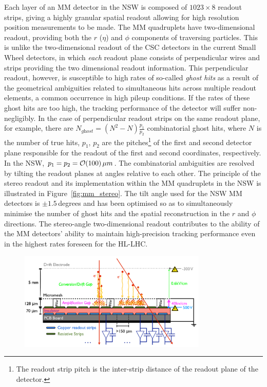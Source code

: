 Each layer of an MM detector in the NSW is composed of $1023 \times 8$ readout strips, giving
a highly granular spatial readout allowing for high resolution position measurements to be made.
The MM quadruplets have two-dimensional readout, providing  both the $r$ ($\eta$)
and $\phi$ components of traversing particles.
This is unlike the two-dimensional readout of the CSC detectors in the current Small Wheel detectors,
in which \textit{each} readout plane consists of perpendicular wires and strips providing
the two dimensional readout information.
This perpendicular readout, however, is susceptible to high rates of so-called \textit{ghost hits}
as a result of the geometrical ambiguities related to simultaneous hits across multiple readout elements, 
a common occurrence in high pileup conditions.
If the rates of these ghost hits are too high, the tracking performance of the detector will suffer non-negligibly.
In the case of perpendicular readout strips on the same readout plane, for example, there are $N_{\textit{ghost}} = (N^2 - N) \frac{p_1}{p_2}$
combinatorial ghost hits, where $N$ is the number of true hits, $p_1$, $p_2$ are the pitches\footnote{The readout strip pitch
is the inter-strip distance of the readout plane of the detector.} of the first and
second detector plane responsible for the readout of the first and second coordinates, respectively.
In the NSW, $p_1 = p_2 = \mathcal{O}(100)\,\mu m$.
The combinatorial ambiguities are resolved by tilting the readout planes at angles relative to
each other.
The principle of the stereo readout and its implementation within the MM quadruplets in the NSW
is illustrated in Figure~\ref{fig:mm_stereo}.
The tilt angle used for the NSW MM detectors is $\pm 1.5$\,degrees and has been optimised so as to simultaneously minimise
the number of ghost hits and the spatial reconstruction in the $r$ and $\phi$ directions.
The stereo-angle two-dimensional readout contributes to the ability of the MM detectors' ability
to maintain high-precision tracking performance even in the highest rates foreseen for the HL-LHC.

\begin{figure}[!htb]
    \begin{center}
        \includegraphics[width=0.8\textwidth]{figures/nsw/nsw_mm_principle}
        \caption{
        }
        \label{fig:nsw_mm_principle}
    \end{center}
\end{figure}

